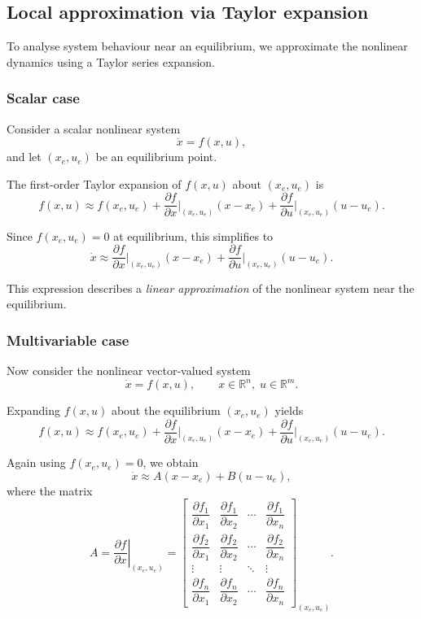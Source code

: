 \subsection{Local approximation via Taylor expansion}

To analyse system behaviour near an equilibrium, we approximate the nonlinear dynamics using a Taylor series expansion.

\subsubsection*{Scalar case}

Consider a scalar nonlinear system
\[
\dot{x} = f(x,u),
\]
and let $(x_e,u_e)$ be an equilibrium point.

The first-order Taylor expansion of $f(x,u)$ about $(x_e,u_e)$ is
\[
f(x,u) \approx f(x_e,u_e)
+ \frac{\partial f}{\partial x}\Big|_{(x_e,u_e)} (x-x_e)
+ \frac{\partial f}{\partial u}\Big|_{(x_e,u_e)} (u-u_e).
\]

Since $f(x_e,u_e)=0$ at equilibrium, this simplifies to
\[
\dot{x} \approx 
\frac{\partial f}{\partial x}\Big|_{(x_e,u_e)} (x-x_e)
+ \frac{\partial f}{\partial u}\Big|_{(x_e,u_e)} (u-u_e).
\]

This expression describes a \emph{linear approximation} of the nonlinear system near the equilibrium.

\subsubsection*{Multivariable case}

Now consider the nonlinear vector-valued system
\[
\dot{x} = f(x,u), 
\qquad 
x \in \mathbb{R}^n, \; u \in \mathbb{R}^m.
\]

Expanding $f(x,u)$ about the equilibrium $(x_e,u_e)$ yields
\[
f(x,u) \approx f(x_e,u_e)
+ \frac{\partial f}{\partial x}\Big|_{(x_e,u_e)} (x-x_e)
+ \frac{\partial f}{\partial u}\Big|_{(x_e,u_e)} (u-u_e).
\]

Again using $f(x_e,u_e)=0$, we obtain
\[
\dot{x} \approx A (x-x_e) + B (u-u_e),
\]
where the matrix
\[
A = \left.\frac{\partial f}{\partial x}\right|_{(x_e,u_e)} 
 =
\left[
\begin{array}{cccc}
	\dfrac{\partial f_1}{\partial x_1} &
	\dfrac{\partial f_1}{\partial x_2} &
	\cdots &
	\dfrac{\partial f_1}{\partial x_n} \\[8pt]
	
	\dfrac{\partial f_2}{\partial x_1} &
	\dfrac{\partial f_2}{\partial x_2} &
	\cdots &
	\dfrac{\partial f_2}{\partial x_n} \\[4pt]
	
	\vdots & \vdots & \ddots & \vdots \\[4pt]
	
	\dfrac{\partial f_n}{\partial x_1} &
	\dfrac{\partial f_n}{\partial x_2} &
	\cdots &
	\dfrac{\partial f_n}{\partial x_n}
\end{array}
\right]_{(x_e,u_e)}.
\]

